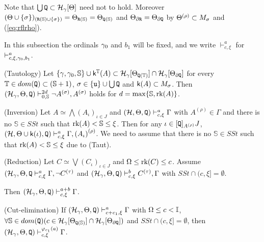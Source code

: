 \documentclass{article}
\newcommand{\mS}{\mathbb{S}}
\newcommand{\mI}{\mathbb{I}}
\newcommand{\mT}{\mathbb{T}}
\begin{document}
Note that 
$\bigcup{\tt Q}\subset\mathcal{H}_{\gamma}[\Theta]$
need not to hold.
Moreover $(\Tht\cup\{\sig\})_{({\tt R}(\mS)\cup\{\sig\})}=\Tht_{{\tt R}(\mS)}=\Tht_{{\tt Q}(\mS)}$ 
and $\Theta_{\partial{\tt R}}=\Theta_{\partial{\tt Q}}$
by 
$\Theta^{(\rho)}\subset M_{\sigma}$ and (\ref{eq:rflrho}).

In this subsection the ordinals $\gamma_{0}$ and $b_{1}$ will be fixed, and
we write $\vdash^{a}_{c,\xi}$ for $\vdash^{a}_{c,\xi,\gamma_{0}, b_{1}}$.



\blem\label{lem:tautology}{\rm (Tautology)}
Let $\{\gam,\gam_{0},\mS\}\cup\sfk^{\mT}(A)\subset\calh_{\gam}[\Tht_{{\tt Q}(\mT)}]\cap
\calh_{\gam}[\Tht_{\partial{\tt Q}}]$ for every 
$\mT\in dom({\tt Q})\subset(\mS+1)$, 
$\sigma\in\{{\tt u}\}\cup\bigcup{\tt Q}$ and ${\sf k}(A)\subset M_{\sigma}$.
Then
$(\mathcal{H}_{\gamma},\Tht,{\tt Q}
)\vdash^{2d}_{0,\mS}
\lnot A^{(\sigma)}, A^{(\sigma)}$ holds for $d=\max\{\mS,\mbox{{\rm rk}}(A)\}$.

\elem




\blem\label{lem:inversionreg}{\rm (Inversion)}
Let  $A\simeq \bigwedge(A_{\iota})_{\iota\in J}$ and
$(\mathcal{H},\Theta,{\tt Q})\vdash^{a}_{c,\xi}\Gamma$ with $A^{(\rho)}\in\Gamma$
and there is no $\mS\in SSt$ such that $\rk(A)<\mS\leq\xi$.
Then for any $\iota\in [{\tt Q}]_{A^{(\rho)}}J$, 
$(\mathcal{H},\Theta\cup{\sf k}(\iota), {\tt Q}
)
\vdash^{a}_{c,\xi}
\Gamma,\left(A_{\iota}\right)^{(\rho)}$.
\elem
\bprf
We need to assume that  there is no $\mS\in SSt$ such that $\rk(A)<\mS\leq\xi$
due to (Taut).
\eprf





\blem\label{prp:reductionpi1}{\rm (Reduction)}
Let $C\simeq\bigvee(C_{\iota})_{\iota\in J}$ and
$\Omega\leq\mbox{{\rm rk}}(C)\leq c$.
Assume
$(\mathcal{H}_{\gamma},\Theta, {\tt Q}\vdash^{a}_{c,\xi}\Gamma,\lnot C^{(\tau)}$
and
$(\mathcal{H}_{\gamma},\Theta,{\tt Q})\vdash^{b}_{c,\xi}C^{(\tau)},\Gamma$
with $SSt\cap(c,\xi]=\emptyset$.

Then
$(\mathcal{H}_{\gamma},\Theta,{\tt Q})\vdash^{a+b}_{c,\xi}\Gamma$.
\elem



\blem\label{lem:predcereg}{\rm (Cut-elimination)}
If 
$(\mathcal{H}_{\gamma},\Theta,{\tt Q})\vdash^{a}_{c+c_{1},\xi}\Gamma$
with $\Ome\leq c<\mI$, $\fal\mS\in dom({\tt Q})(c\in\calh_{\gam}[\Tht_{{\tt Q}(\mS)}]\cap
\calh_{\gam}[\Tht_{\partial{\tt Q}}])$ and $SSt\cap(c,\xi]=\emptyset$,
then $(\mathcal{H}_{\gamma},\Theta,{\tt Q})\vdash^{\varphi_{c_{1}}(a)}_{c,\xi}\Gamma$.
\elem
\end{document}
